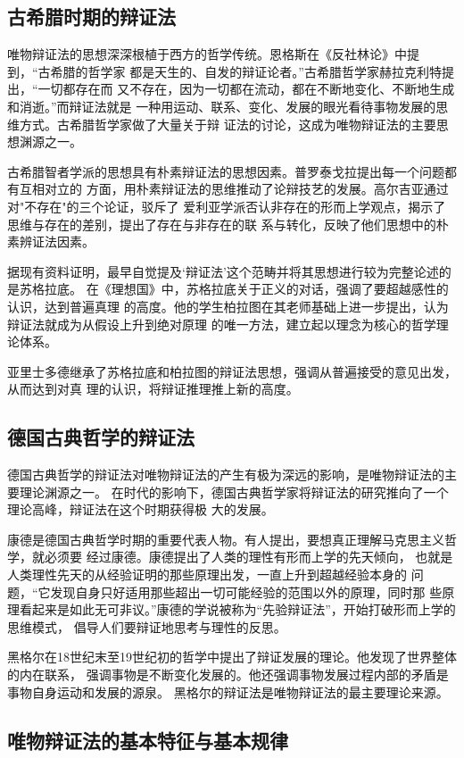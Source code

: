 \documentclass{article}
\begin{document}
\subsection{古希腊时期的辩证法}
    唯物辩证法的思想深深根植于西方的哲学传统。恩格斯在《反社林论》中提到，“古希腊的哲学家
    都是天生的、自发的辩证论者。”\cite{恩格斯}古希腊哲学家赫拉克利特提出，“一切都存在而
    又不存在，因为一切都在流动，都在不断地变化、不断地生成和消逝。”而辩证法就是
    一种用运动、联系、变化、发展的眼光看待事物发展的思维方式。古希腊哲学家做了大量关于辩
    证法的讨论，这成为唯物辩证法的主要思想渊源之一。\par
    古希腊智者学派的思想具有朴素辩证法的思想因素。普罗泰戈拉提出每一个问题都有互相对立的
    方面，用朴素辩证法的思维推动了论辩技艺的发展。高尔吉亚通过对"不存在"的三个论证，驳斥了
    爱利亚学派否认非存在的形而上学观点，揭示了思维与存在的差别，提出了存在与非存在的联
    系与转化，反映了他们思想中的朴素辨证法因素。\par
    据现有资料证明，最早自觉提及‘辩证法’这个范畴并将其思想进行较为完整论述的是苏格拉底。
    \cite{王芳恒}在《理想国》中，苏格拉底关于正义的对话，强调了要超越感性的认识，达到普遍真理
    的高度。他的学生柏拉图在其老师基础上进一步提出，认为辩证法就成为从假设上升到绝对原理
    的唯一方法，建立起以理念为核心的哲学理论体系。\par
    亚里士多德继承了苏格拉底和柏拉图的辩证法思想，强调从普遍接受的意见出发，从而达到对真
    理的认识，将辩证推理推上新的高度。
\subsection{德国古典哲学的辩证法}
    德国古典哲学的辩证法对唯物辩证法的产生有极为深远的影响，是唯物辩证法的主要理论渊源之一。
    在时代的影响下，德国古典哲学家将辩证法的研究推向了一个理论高峰，辩证法在这个时期获得极
    大的发展。\par
    康德是德国古典哲学时期的重要代表人物。有人提出，要想真正理解马克思主义哲学，就必须要
    经过康德。\cite{俞吾金}康德提出了人类的理性有形而上学的先天倾向，
    也就是人类理性先天的从经验证明的那些原理出发，一直上升到超越经验本身的
    问题，“它发现自身只好适用那些超出一切可能经验的范围以外的原理，同时那
    些原理看起来是如此无可非议。”康德的学说被称为“先验辩证法”，开始打破形而上学的思维模式，
    倡导人们要辩证地思考与理性的反思。\par
    黑格尔在18世纪末至19世纪初的哲学中提出了辩证发展的理论。他发现了世界整体的内在联系，
    强调事物是不断变化发展的。他还强调事物发展过程内部的矛盾是事物自身运动和发展的源泉。
    黑格尔的辩证法是唯物辩证法的最主要理论来源。
    \begin{center}
\section{唯物辩证法的基本特征与基本规律}
    \end{center}
\end{document}
